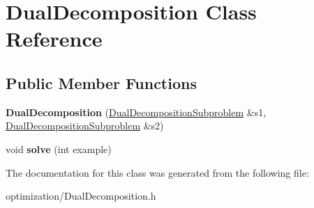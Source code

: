 \hypertarget{classDualDecomposition}{
\section{DualDecomposition Class Reference}
\label{classDualDecomposition}
}
\subsection*{Public Member Functions}
\begin{DoxyCompactItemize}
\item 
\hypertarget{classDualDecomposition_a652c2229bad83ce7b135aa06ef1283a5}{
{\bfseries DualDecomposition} (\hyperlink{classDualDecompositionSubproblem}{DualDecompositionSubproblem} \&s1, \hyperlink{classDualDecompositionSubproblem}{DualDecompositionSubproblem} \&s2)}
\label{classDualDecomposition_a652c2229bad83ce7b135aa06ef1283a5}

\item 
\hypertarget{classDualDecomposition_a0013544261cba254dc2ca2c68cbb1679}{
void {\bfseries solve} (int example)}
\label{classDualDecomposition_a0013544261cba254dc2ca2c68cbb1679}

\end{DoxyCompactItemize}


The documentation for this class was generated from the following file:\begin{DoxyCompactItemize}
\item 
optimization/DualDecomposition.h\end{DoxyCompactItemize}
